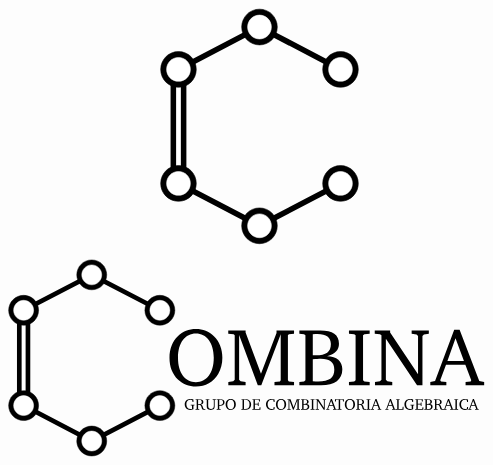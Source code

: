 \documentclass{article}
\newcommand{\ratio}{2.5} %
\newcommand{\ratiobullet}{0.45} %
\newcommand{\ratiobulletp}{0.3} %
\newcommand{\widthline}{1.4} %
\newcommand{\degone}{35}
\newcommand{\degtwo}{90}
\newcommand{\degthr}{145}
\newcommand{\cis}[2]{
	( \fpeval{\ratio*cosd(#1)+#2}, \fpeval{\ratio*sind(#1)} )
}
\newcommand{\nodeg}[2][0]{
	\filldraw[color=black,fill=black]\cis{#2}{#1}circle(\ratiobullet);
	\filldraw[color=white,fill=white]\cis{#2}{#1}circle(\ratiobulletp);
}
\begin{document}
\newcommand{\letterc}{

	\draw[line width=4mm,black]\cis{\degthr}{0}--\cis{-\degthr}{0} ; %
	\draw[line width=1.2mm,white]\cis{\degthr}{0}--\cis{-\degthr}{0}; %

	\draw[line width=\widthline mm]\cis{+\degone}{0}--\cis{+\degtwo}{0}--\cis{+\degthr}{0}; %
	\draw[line width=\widthline mm]\cis{-\degone}{0}--\cis{-\degtwo}{0}--\cis{-\degthr}{0}; %

	\nodeg{+\degone}
	\nodeg{-\degone}
	\nodeg{+\degtwo}
	\nodeg{-\degtwo}
	\nodeg{+\degthr}
	\nodeg{-\degthr}

}

\[
\begin{tikzpicture}
	\letterc
\end{tikzpicture}
\]

\[\begin{tikzpicture}
	\letterc
	\node[scale=7]at(7,0){\fontfamily{bch}\selectfont
		OMBINA
	};
	\node[scale=1.35]at(7.2,-1.4){\fontfamily{bch}\selectfont
		GRUPO DE COMBINATORIA ALGEBRAICA
	};
\end{tikzpicture}\]
\end{document}
